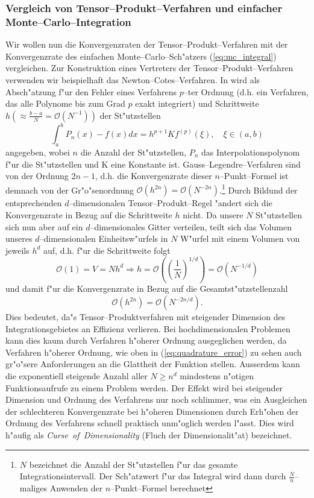 \documentclass[11pt,a4paper,DIVcalc,BCOR8mm,titlepage,twoside]{scrartcl}
\begin{document}
	\subsubsection{Vergleich von Tensor--Produkt--Verfahren und einfacher Monte--Carlo--Integration}\label{subsec:integrationsproblem_comparison}
	Wir wollen nun die Konvergenzraten der Tensor--Produkt--Verfahren mit der Konvergenzrate des einfachen Monte--Carlo--Sch"atzers (\ref{eq:mc_integral}) vergleichen. Zur Konstruktion eines Vertreters der Tensor--Produkt--Verfahren verwenden wir beispielhaft das Newton--Cotes--Verfahren. In \citep[][3.1.4]{Stoer:2005p10586} wird als Absch"atzung f"ur den Fehler eines Verfahrens $p$--ter Ordnung (d.h. ein Verfahren, das alle Polynome bis zum Grad $p$ exakt integriert) und Schrittweite $h(\approx\frac{b-a}{N}=\mathcal{O}(N^{-1}))$ der St"utzstellen
	\begin{equation}
		\int_a^b P_n(x)-f(x)dx=h^{p+1}K f^{(p)}(\xi),\quad\xi\in(a,b)
		\label{eq:quadrature_error}
	\end{equation}
	angegeben, wobei $n$ die Anzahl der St"utzstellen, $P_n$ das Interpolationspolynom f"ur die St"utzstellen und K eine Konstante ist. Gauss--Legendre--Verfahren sind von der Ordnung $2n-1$, d.h. die Konvergenzrate dieser $n$--Punkt--Formel ist demnach von der Gr"o"senordnung $\mathcal{O}(h^{2n})=\mathcal{O}(N^{-2n})$.\footnote{$N$ bezeichnet die Anzahl der St"utzstellen f"ur das gesamte Integrationsintervall. Der Sch"atzwert f"ur das Integral wird dann durch $\frac{N}{n}$--maliges Anwenden der $n$--Punkt--Formel berechnet}
	Durch Bildund der entsprechenden $d$--dimensionalen Tensor--Produkt--Regel "andert sich die Konvergenzrate in Bezug auf die Schrittweite $h$ nicht. Da unsere $N$ St"utzstellen sich nun aber auf ein $d$--dimensionales Gitter verteilen, teilt sich das Volumen unseres $d$--dimensionalen Einheitsw"urfels in $N$ W"urfel mit einem Volumen von jeweils $h^d$ auf, d.h. f"ur die Schrittweite folgt
	$$\mathcal{O}(1)=V=N h^d \Rightarrow h=\mathcal{O}\left(\left(\frac{1}{N}\right)^{1/d}\right)=\mathcal{O}\left(N^{-1/d}\right)$$	
	und damit f"ur die Konvergenzrate in Bezug auf die Gesamtst"utzstellenzahl
	$$\mathcal{O}(h^{2n})=\mathcal{O}(N^{-2n/d}).$$
	Dies bedeutet, da"s Tensor--Produktverfahren mit steigender Dimension des Integrationsgebietes an Effizienz verlieren. Bei hochdimensionalen Problemen kann dies kaum durch Verfahren h"oherer Ordnung ausgeglichen werden, da Verfahren h"oherer Ordnung, wie oben in (\ref{eq:quadrature_error}) zu sehen auch gr"o"sere Anforderungen an die Glattheit der Funktion stellen. Ausserdem kann die exponentiell steigende Anzahl aller $N \geq n^d$ mindestens n"otigen Funktionsaufrufe zu einem Problem werden. Der Effekt wird bei steigender Dimension und Ordnung des Verfahrens nur noch schlimmer, was ein Ausgleichen der schlechteren Konvergenzrate bei h"oheren Dimensionen durch Erh"ohen der Ordnung des Verfahrens schnell praktisch unm"oglich werden l"asst. Dies wird h"aufig als {\em Curse~of~Dimensionality} (Fluch der Dimensionalit"at) bezeichnet.
	
\end{document}
